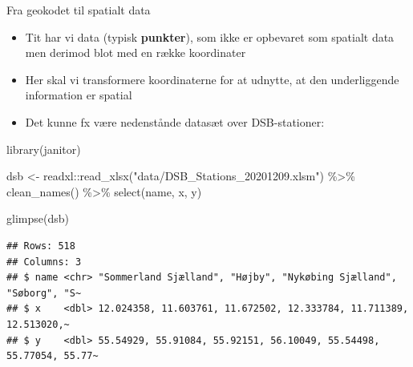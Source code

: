 \documentclass[
  8pt,
  ignorenonframetext,
  aspectratio=169]{beamer}
\newenvironment{Shaded}{}{}
\newcommand{\FunctionTok}[1]{\textcolor[rgb]{0.02,0.16,0.49}{#1}}
\newcommand{\NormalTok}[1]{#1}
\newcommand{\OtherTok}[1]{\textcolor[rgb]{0.00,0.44,0.13}{#1}}
\newcommand{\SpecialCharTok}[1]{\textcolor[rgb]{0.25,0.44,0.63}{#1}}
\newcommand{\StringTok}[1]{\textcolor[rgb]{0.25,0.44,0.63}{#1}}
\begin{document}
\begin{frame}[fragile]{Fra geokodet til spatialt data}
\protect\hypertarget{fra-geokodet-til-spatialt-data}{}
\begin{itemize}
\item
  Tit har vi data (typisk \textbf{punkter}), som ikke er opbevaret som
  spatialt data men derimod blot med en række koordinater
\item
  Her skal vi transformere koordinaterne for at udnytte, at den
  underliggende information er spatial
\item
  Det kunne fx være nedenstånde datasæt over DSB-stationer:
\end{itemize}

\tiny

\begin{Shaded}
\begin{Highlighting}[]
\FunctionTok{library}\NormalTok{(janitor)}

\NormalTok{dsb }\OtherTok{\textless{}{-}}\NormalTok{ readxl}\SpecialCharTok{::}\FunctionTok{read\_xlsx}\NormalTok{(}\StringTok{"data/DSB\_Stations\_20201209.xlsm"}\NormalTok{) }\SpecialCharTok{\%\textgreater{}\%} 
  \FunctionTok{clean\_names}\NormalTok{() }\SpecialCharTok{\%\textgreater{}\%} 
  \FunctionTok{select}\NormalTok{(name, x, y)}

\FunctionTok{glimpse}\NormalTok{(dsb)}
\end{Highlighting}
\end{Shaded}

\begin{verbatim}
## Rows: 518
## Columns: 3
## $ name <chr> "Sommerland Sjælland", "Højby", "Nykøbing Sjælland", "Søborg", "S~
## $ x    <dbl> 12.024358, 11.603761, 11.672502, 12.333784, 11.711389, 12.513020,~
## $ y    <dbl> 55.54929, 55.91084, 55.92151, 56.10049, 55.54498, 55.77054, 55.77~
\end{verbatim}

\normalsize
\end{frame}
\end{document}
